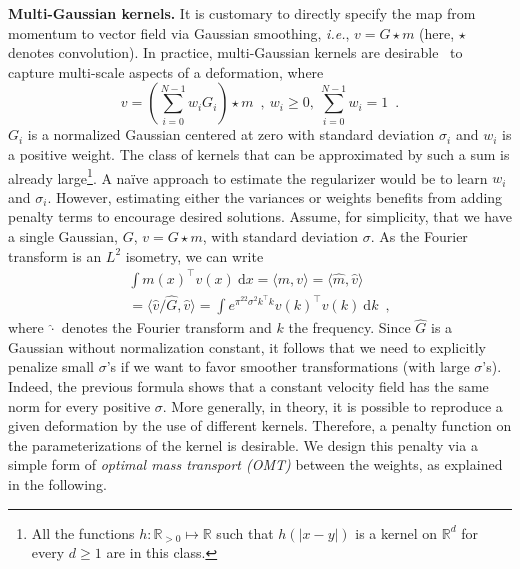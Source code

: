 \documentclass[10pt,twocolumn,letterpaper,table]{article}
\numberwithin{equation}{section}
\theoremstyle{plain}
\theoremstyle{definition}
\def\R{{\mathbb R}}
\def\ie{\emph{i.e.}}  \def\Ie{\emph{I.e.}}
\begin{document}
\noindent
\textbf{Multi-Gaussian kernels.}
It is customary to directly specify 
the map from momentum to vector field via Gaussian smoothing, \ie, $v=G\star m$ (here, $\star$ denotes convolution). In practice, multi-Gaussian kernels are desirable~\cite{risser2011simultaneous} to capture multi-scale aspects of a deformation, where
\begin{equation}
  v=\left(\sum_{i=0}^{N-1} w_i G_i\right)\star m\enspace,~w_i\geq 0,~\sum_{i=0}^{N-1}w_i=1\enspace.
\label{eqn:mgkernel}
\end{equation}
$G_i$ is a normalized Gaussian centered at zero with standard deviation $\sigma_i$ and $w_i$ is a positive weight. The class of kernels that can be approximated by such a sum is already large\footnote{All the functions $h: \R_{>0} \mapsto \R$ such that $h(|x-y|)$ is a kernel on $\R^d$ for every $d \geq 1$ are in this class.}. 
A na\"ive approach to estimate the regularizer would be to learn $w_i$ and $\sigma_i$. However, estimating either the variances or weights benefits from adding penalty terms to encourage desired solutions. Assume, for simplicity, that we have a single Gaussian, $G$, $v=G\star m$, with standard deviation $\sigma$. As the Fourier transform is an $L^2$ isometry, we can write
\begin{multline}
  \int m(x)^\top v(x)~\mathrm{d}x = \langle m,v\rangle = \langle \hat{m},\hat{v}\rangle \\ = \langle \hat{v}/\hat{G},\hat{v}\rangle = \int e^{\pi^22\sigma^2 k^\top k}v(k)^
  \top v(k)~\mathrm{d}k\enspace,
\end{multline}
where $\hat{\cdot}$ denotes the Fourier transform and $k$ the frequency. Since $\hat{G}$ is a Gaussian without normalization constant, it follows that we need to explicitly penalize small $\sigma$'s if we want to favor smoother transformations (with large $\sigma$'s). 
Indeed, the previous formula shows that a constant velocity field has the same norm for every positive $\sigma$. More generally, in theory, it is possible to reproduce a given deformation by the use of different kernels. Therefore, a penalty function on the parameterizations of the kernel is desirable. We design this penalty via a simple form of \emph{optimal mass transport (OMT)} between the weights, as explained in the following.
\end{document}
